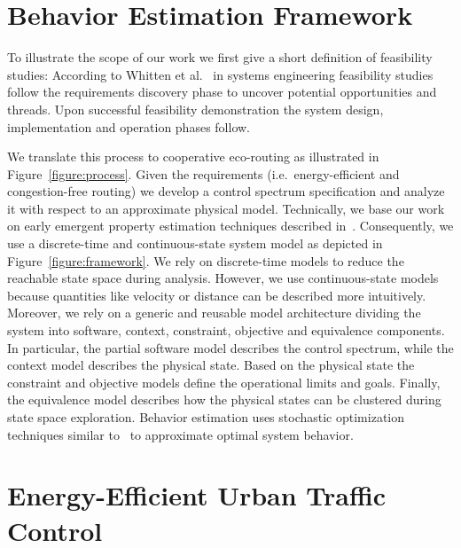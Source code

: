 \documentclass[conference]{../cls/IEEEtran}
\begin{document}
\section{Behavior Estimation Framework}

To illustrate the scope of our work we first give a short definition of feasibility studies: 
According to Whitten et al.~\cite{Whitten2005} in systems engineering feasibility studies follow the requirements discovery phase to uncover potential opportunities and threads.
Upon successful feasibility demonstration the system design, implementation and operation phases follow.

We translate this process to cooperative eco-routing as illustrated in Figure~\ref{figure:process}.
Given the requirements (i.e.\ energy-efficient and congestion-free routing) we develop a control spectrum specification and analyze it with respect to an approximate physical model.
Technically, we base our work on early emergent property estimation techniques described in~\cite{Hackenberg2012}.
Consequently, we use a discrete-time and continuous-state system model as depicted in Figure~\ref{figure:framework}.
We rely on discrete-time models to reduce the reachable state space during analysis.
However, we use continuous-state models because quantities like velocity or distance can be described more intuitively.
Moreover, we rely on a generic and reusable model architecture dividing the system into software, context, constraint, objective and equivalence components.
In particular, the partial software model describes the control spectrum, while the context model describes the physical state.
Based on the physical state the constraint and objective models define the operational limits and goals.
Finally, the equivalence model describes how the physical states can be clustered during state space exploration.
Behavior estimation uses stochastic optimization techniques similar to~\cite{Pereira1991} to approximate optimal system behavior.

\section{Energy-Efficient Urban Traffic Control}
\end{document}
